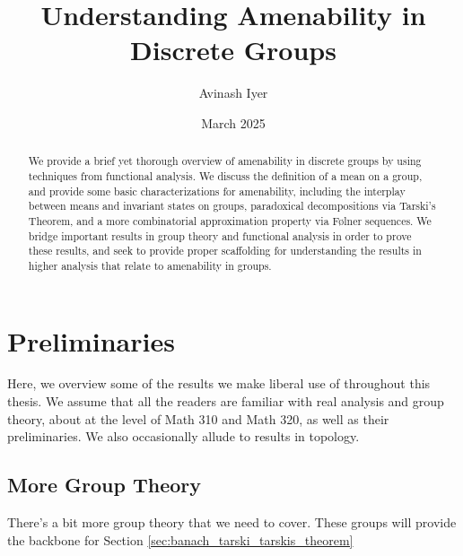 \documentclass[10pt]{mypackage2}
\title{Understanding Amenability in Discrete Groups}
\author{Avinash Iyer}
\date{March 2025}
\begin{document}
\maketitle
\RaggedRight
\begin{abstract}
  We provide a brief yet thorough overview of amenability in discrete groups by using techniques from functional analysis. We discuss the definition of a mean on a group, and provide some basic characterizations for amenability, including the interplay between means and invariant states on groups, paradoxical decompositions via Tarski's Theorem, and a more combinatorial approximation property via Følner sequences. We bridge important results in group theory and functional analysis in order to prove these results, and seek to provide proper scaffolding for understanding the results in higher analysis that relate to amenability in groups.
\end{abstract}
\section{Preliminaries}\label{sec:preliminaries}%
Here, we overview some of the results we make liberal use of throughout this thesis. We assume that all the readers are familiar with real analysis and group theory, about at the level of Math 310 and Math 320, as well as their preliminaries. We also occasionally allude to results in topology.
\subsection{More Group Theory}%
There's a bit more group theory that we need to cover. These groups will provide the backbone for Section \ref{sec:banach_tarski_tarskis_theorem}\newline
\end{document}

